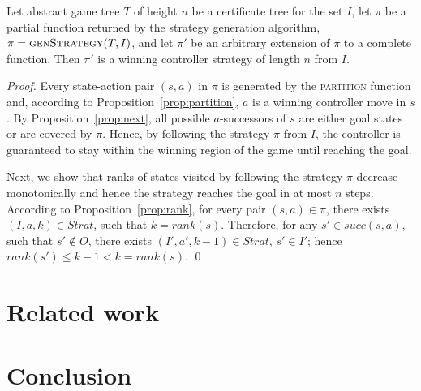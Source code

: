 \begin{theorem}
Let abstract game tree $T$ of height $n$ be a certificate tree for
the set $I$, let $\pi$ be a partial function returned by the
strategy generation algorithm, $\pi=\textsc{genStrategy}(T,I)$,
and let $\pi'$ be an arbitrary extension of $\pi$ to a complete
function.  Then $\pi'$ is a winning controller strategy of length
$n$ from $I$.
\end{theorem}
\begin{proof}
Every state-action pair $(s, a)$ in $\pi$ is generated by the
\textsc{partition} function and, according to
Proposition~\ref{prop:partition}, $a$ is a winning controller move
in $s$. By Proposition~\ref{prop:next}, all possible
$a$-successors of $s$ are either goal states or are covered by
$\pi$.  Hence, by following the strategy $\pi$ from $I$, the
controller is guaranteed to stay within the winning region of the
game until reaching the goal.

Next, we show that ranks of states visited by following the
strategy $\pi$ decrease monotonically and hence the strategy
reaches the goal in at most $n$ steps. According to
Proposition~\ref{prop:rank}, for every pair $(s,a) \in \pi$, there
exists $(I, a, k)\in Strat$, such that $k=rank(s)$.  Therefore,
for any $s'\in succ(s,a)$, such that $s'\not\in O$, there exists
$(I', a', k-1)\in Strat$, $s'\in I'$; hence $rank(s')\leq k-1 < k
= rank(s)$.
\qed
\end{proof}

\section{Related work}

\section{Conclusion}
